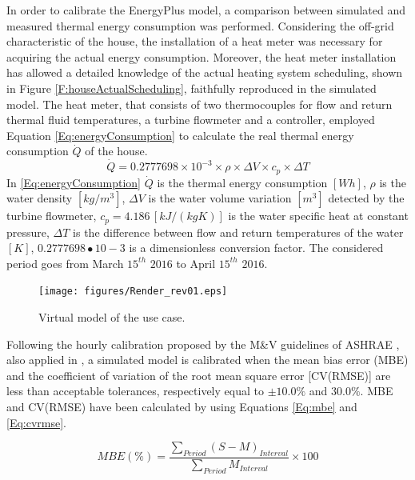 In order to calibrate the EnergyPlus model, a comparison between simulated and measured thermal energy consumption was performed. Considering the off-grid characteristic of the house, the installation of a heat meter was necessary for acquiring the actual energy consumption. Moreover, the heat meter installation has allowed a detailed knowledge of the actual heating system scheduling, shown in Figure \ref{F:houseActualScheduling}, faithfully reproduced in the simulated model. The heat meter, that consists of two thermocouples for flow and return thermal fluid temperatures, a turbine flowmeter and a controller, employed Equation \eqref{Eq:energyConsumption} to calculate the real thermal energy consumption $\dot Q$ of the house.
\begin{equation}\label{Eq:energyConsumption}
\dot Q = 0.2777698\times10^{-3}\times\rho\times\Delta V\times c_p\times\Delta T
\end{equation}
In \eqref{Eq:energyConsumption} $\dot Q$ is the thermal energy consumption $[Wh]$, $\rho$ is the water density $[kg/m^3]$, $\Delta V$ is the water volume variation $[m^3]$ detected by the turbine flowmeter, $c_p = 4.186\, [kJ/(kgK)]$ is the water specific heat at constant pressure, $\Delta T$ is the difference between flow and return temperatures of the water $[K]$, $0.2777698∙10−3$ is a dimensionless conversion factor. The considered period goes from March $15^{th}$ $2016$ to April $15^{th}$ $2016$.
\begin{figure}[t!]
	\begin{center}
		\texttt{[image: figures/Render\_rev01.eps]}
		\caption{Virtual model of the use case.}
		\captionsetup{justification=centering}
		\label{F:houseVirtualModel}
	\end{center}
\end{figure}
Following the hourly calibration proposed by the M\&V guidelines of ASHRAE \cite{USDOE}, also applied in \cite{Mustafarai2014,Raftery2011}, a simulated model is calibrated when the mean bias error (MBE) and the coefficient of variation of the root mean square error [CV(RMSE)] are less than acceptable tolerances, respectively equal to $\pm 10.0\%$ and $30.0\%$. MBE and CV(RMSE) have been calculated by using Equations \eqref{Eq:mbe} and \eqref{Eq:cvrmse}.

\begin{equation}\label{Eq:mbe}
MBE(\%) = \frac{\sum_{Period}{(S-M)_{Interval}}}{\sum_{Period}{M_{Interval}}} \times 100
\end{equation}

